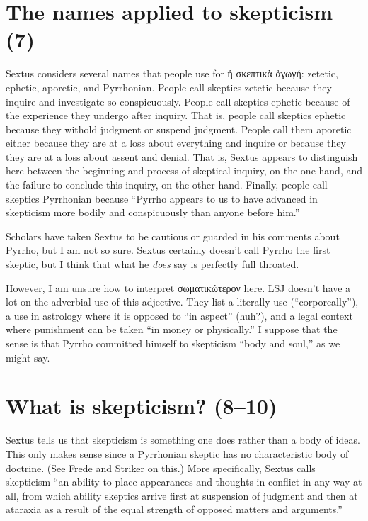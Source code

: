 \section{The names applied to skepticism (7)}


Sextus considers several names that people use for \textgreek{ἡ σκεπτικὰ ἀγωγή}: zetetic, ephetic, aporetic, and Pyrrhonian. People call skeptics zetetic because they inquire and investigate so conspicuously. People call skeptics ephetic because of the experience they undergo after inquiry. That is, people call skeptics ephetic because they withold judgment or suspend judgment. People call them aporetic either because they are at a loss about everything and inquire or because they they are at a loss about assent and denial. That is, Sextus appears to distinguish here between the beginning and process of skeptical inquiry, on the one hand, and the failure to conclude this inquiry, on the other hand. Finally, people call skeptics Pyrrhonian because ``Pyrrho appears to us to have advanced in skepticism more bodily and conspicuously than anyone before him.''

Scholars have taken Sextus to be cautious or guarded in his comments about Pyrrho, but I am not so sure. Sextus certainly doesn't call Pyrrho the first skeptic, but I think that what he \textit{does} say is perfectly full throated.

However, I am unsure how to interpret \textgreek{σωματικώτερον} here. LSJ doesn't have a lot on the adverbial use of this adjective. They list a literally use (``corporeally''), a use in astrology where it is opposed to ``in aspect'' (huh?), and a legal context where punishment can be taken ``in money or physically.'' I suppose that the sense is that Pyrrho committed himself to skepticism ``body and soul,'' as we might say.

\section{What is skepticism? (8--10)}

Sextus tells us that skepticism is something one does rather than a body of ideas. This only makes sense since a Pyrrhonian skeptic has no characteristic body of doctrine. (See Frede and Striker on this.) More specifically, Sextus calls skepticism ``an ability to place appearances and thoughts in conflict in any way at all, from which ability skeptics arrive first at suspension of judgment and then at ataraxia as a result of the equal strength of opposed matters and arguments.''

